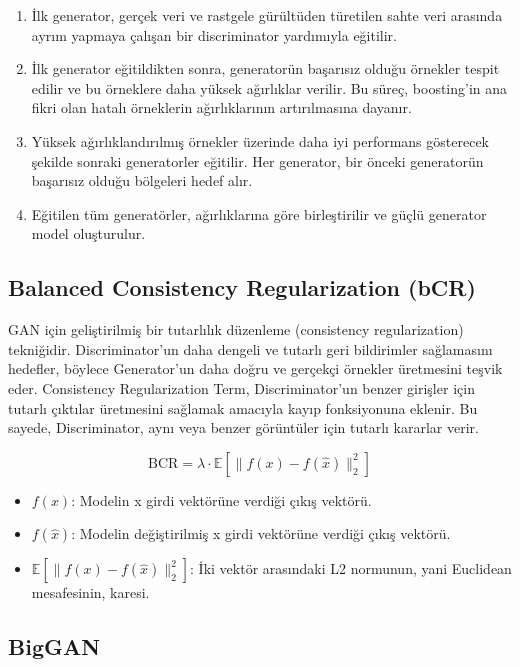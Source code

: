 \begin{enumerate}
    \item İlk generator, gerçek veri ve rastgele gürültüden türetilen sahte veri arasında ayrım yapmaya çalışan bir discriminator yardımıyla eğitilir.
    \item İlk generator eğitildikten sonra, generatorün başarısız olduğu örnekler tespit edilir ve bu örneklere daha yüksek ağırlıklar verilir. Bu süreç, boosting'in ana fikri olan hatalı örneklerin ağırlıklarının artırılmasına dayanır.
    \item Yüksek ağırlıklandırılmış örnekler üzerinde daha iyi performans gösterecek şekilde sonraki generatorler eğitilir. Her generator, bir önceki generatorün başarısız olduğu bölgeleri hedef alır.
    \item Eğitilen tüm generatörler, ağırlıklarına göre birleştirilir ve güçlü generator model oluşturulur.
\end{enumerate}

\subsection{Balanced Consistency Regularization (bCR)}

GAN için geliştirilmiş bir tutarlılık düzenleme (consistency regularization) tekniğidir. Discriminator'un daha dengeli ve tutarlı geri bildirimler sağlamasını hedefler, böylece Generator'un daha doğru ve gerçekçi örnekler üretmesini teşvik eder. Consistency Regularization Term, Discriminator'un benzer girişler için tutarlı çıktılar üretmesini sağlamak amacıyla kayıp fonksiyonuna eklenir. Bu sayede, Discriminator, aynı veya benzer görüntüler için tutarlı kararlar verir.  

\[ \text{BCR} = \lambda \cdot \mathbb{E}\left[\|f(x) - f(\hat{x})\|_2^2\right] \]

\begin{itemize}
    \item $f(x)$: Modelin x girdi vektörüne verdiği çıkış vektörü.
    \item $f(\hat{x})$: Modelin değiştirilmiş x girdi vektörüne verdiği çıkış vektörü.
    \item $\mathbb{E}\left[\|f(x) - f(\hat{x})\|_2^2\right]$: İki vektör arasındaki L2 normunun, yani Euclidean mesafesinin, karesi.
\end{itemize}

\subsection{BigGAN}

